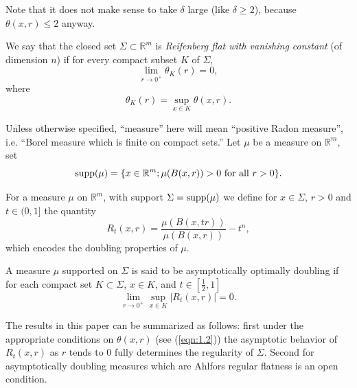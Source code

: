 \documentclass[12pt,leqno]{article}
\newcommand{\supp}{{\rm supp}}
\newcommand{\RR}{\mathbb{R}}
\theoremstyle{plain}
\numberwithin{equation}{section}
\begin{document}
Note that it does not make sense to take $\delta$ large (like $\delta\ge
2$), because $\theta(x,r)\le 2$ anyway.


\begin{defn}\label{defn:1.6}
We say that the closed set $\Sigma\subset\RR^m$ is
\emph{Reifenberg flat with vanishing constant}
(of dimension $n$) if for every compact subset
$K$ of $\Sigma$,
\begin{equation}\label{eqn:1.7}
\lim_{r\to 0^+} \theta_K(r)=0,
\end{equation}
where
\begin{equation}\label{eqn:1.?}
\theta_K(r) = \sup_{x\in K} \theta(x,r).
\end{equation}
\end{defn}






Unless otherwise specified,
``measure'' here will mean ``positive Radon measure'', i.e. ``Borel measure
which is finite on compact sets.'' Let $\mu$ be a measure on $\RR^m$, set
\begin{equation}\label{eqn:1.8}
\supp (\mu) = \{x\in\RR^m; \mu(B(x,r))>0\hbox{ for all }r>0\}.
\end{equation}


For a measure $\mu$ on $\RR^m$, with support $\Sigma=
\supp(\mu)$ we define for $x\in\Sigma$, $r>0$ and $t\in (0,1]$
the quantity
\begin{equation}\label{eqn:1.11}
R_t(x,r) = \frac{\mu(B(x,tr))}{\mu(B(x,r))}-t^n,
\end{equation}
which encodes the doubling properties of $\mu$.

\begin{defn}\label{defn:1.6A}
A measure $\mu$ supported on $\Sigma$ is said to be asymptotically
optimally doubling if
for each compact set
$K\subset \Sigma$, $x\in K$, and $t\in [\frac{1}{2},1]$
\begin{equation}\label{eqn:1.10}
\lim_{r\to 0^+}\sup_{x\in K}|R_t(x,r)|=0.
\end{equation}
\end{defn}

The results in this paper can be summarized as follows: first
under the appropriate conditions on $\theta(x,r)$
(see (\ref{eqn:1.2})) the asymptotic behavior of $R_t(x,r)$ as $r$
tends to 0 fully determines the regularity of $\Sigma$.
Second for asymptotically doubling measures which are Ahlfors regular
flatness is an open condition.
\end{document}
